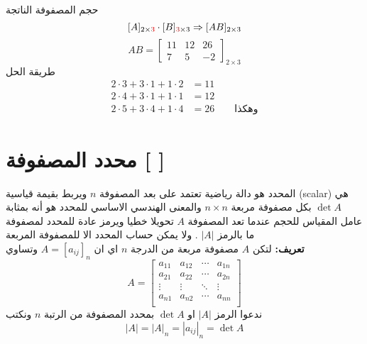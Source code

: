 حجم المصفوفة الناتجة 
\[
[A]_{2\times \textcolor{red}{3}}\cdot [B]_{\textcolor{red}{3}\times 3} \Rightarrow [AB]_{2\times 3}
\]
\[
AB = 
\begin{bmatrix}
	11& 12& 26\\
	7 &5& -2 
\end{bmatrix}_{2\times 3}
\]
طريقة الحل 
\begin{align*}
	2\cdot3 + 3\cdot1 +1\cdot2&=11\\
	2\cdot4 + 3\cdot1 + 1\cdot1 &= 12\\
	2\cdot5 + 3\cdot4 + 1\cdot 4&= 26 \qquad \text{وهكذا}
\end{align*}

\section*{محدد المصفوفة [ ]}
المحدد هو دالة رياضية تعتمد على بعد المصفوفة $n$ ويربط بقيمة قياسية (scalar) هي $\det A$ بكل مصفوفة مربعة $n\times n$ والمعنى الهندسي الاساسي للمحدد هو أنه بمثابة عامل المقياس للحجم عندما تعد المصفوفة $A$ تحويلا خطيا ويرمز عادة للمحدد لمصفوفة ما بالرمز $|A|$ . ولا يمكن حساب المحدد الا للمصفوفة المربعة\\ [10pt]
\noindent
\textbf{تعريف:} لتكن $A$ مصفوفة مربعة من الدرجة $n$ اي ان $A=[a_{ij}]_n$ وتساوي
\[
A =
\begin{bmatrix}
	a_{11} & a_{12} & \cdots & a_{1n}\\
	a_{21} & a_{22} & \cdots & a_{2n}\\
		\vdots & \vdots & \ddots & \vdots\\
	a_{n1} & a_{n2} & \cdots & a_{nn}\\
\end{bmatrix}
\] 
ندعوا الرمز $|A|$ او $\det A$ بمحدد المصفوفة من الرتبة $n$ ونكتب
\[
|A| = |A|_n = |a_{ij}|_{n} = \det A
\]


